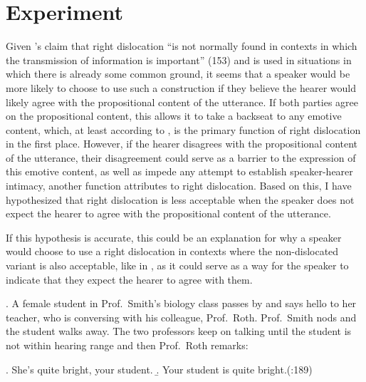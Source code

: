 \documentclass[titlepage,12pt]{article}
\begin{document}
\section{Experiment} \label{exp}

Given \citeauthor{aijmer_themes_1989}'s \citeyear{aijmer_themes_1989} claim that right dislocation ``is not normally found in contexts in which the transmission of information is important'' (153) and is used in situations in which there is already some common ground, it seems that a speaker would be more likely to choose to use such a construction if they believe the hearer would likely agree with the propositional content of the utterance. If both parties agree on the propositional content, this allows it to take a backseat to any emotive content, which, at least according to \citeauthor{aijmer_themes_1989}, is the primary function of right dislocation in the first place. However, if the hearer disagrees with the propositional content of the utterance, their disagreement could serve as a barrier to the expression of this emotive content, as well as impede any attempt to establish speaker-hearer intimacy, another function \citeauthor{aijmer_themes_1989} attributes to right dislocation. Based on this, I have hypothesized that right dislocation is less acceptable when the speaker does not expect the hearer to agree with the propositional content of the utterance. 

If this hypothesis is accurate, this could be an explanation for why a speaker would choose to use a right dislocation in contexts where the non-dislocated variant is also acceptable, like in \Next, as it could serve as a way for the speaker to indicate that they expect the hearer to agree with them.

\ex. A female student in Prof.\ Smith's biology class passes by and says hello to her teacher, who is conversing with his colleague, Prof.\ Roth. Prof.\ Smith nods and the student walks away. The two professors keep on talking until the student is not within hearing range and then Prof.\ Roth remarks:

\a. She's quite bright, your student.
\b. Your student is quite bright.\hfill(\citealp{ziv_right_1994}:189)


\end{document}

